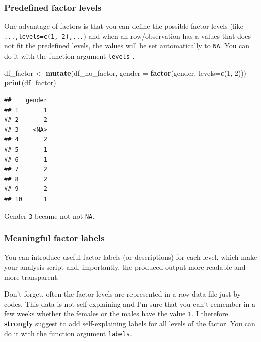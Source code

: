 \documentclass[
]{scrartcl}
\newenvironment{Shaded}{\begin{snugshade}}{\end{snugshade}}
\newcommand{\DataTypeTok}[1]{\textcolor[rgb]{0.13,0.29,0.53}{#1}}
\newcommand{\DecValTok}[1]{\textcolor[rgb]{0.00,0.00,0.81}{#1}}
\newcommand{\KeywordTok}[1]{\textcolor[rgb]{0.13,0.29,0.53}{\textbf{#1}}}
\newcommand{\NormalTok}[1]{#1}
\newcommand{\StringTok}[1]{\textcolor[rgb]{0.31,0.60,0.02}{#1}}
\begin{document}
\hypertarget{predefined-factor-levels}{%
\subsubsection{Predefined factor levels}\label{predefined-factor-levels}}

One advantage of factors is that you can define the possible factor levels (like \texttt{...,levels=c(1,\ 2),...}) and when an row/observation has a values that does not fit the predefined levels, the values will be set automatically to \texttt{NA}. You can do it with the function argument \texttt{levels} .

\begin{Shaded}
\begin{Highlighting}[]
\NormalTok{df\_factor \textless{}{-}}\StringTok{  }\KeywordTok{mutate}\NormalTok{(df\_no\_factor,}
            \DataTypeTok{gender =} \KeywordTok{factor}\NormalTok{(gender, }\DataTypeTok{levels=}\KeywordTok{c}\NormalTok{(}\DecValTok{1}\NormalTok{, }\DecValTok{2}\NormalTok{)))}
\KeywordTok{print}\NormalTok{(df\_factor)}
\end{Highlighting}
\end{Shaded}

\begin{verbatim}
##    gender
## 1       1
## 2       2
## 3    <NA>
## 4       2
## 5       1
## 6       1
## 7       2
## 8       2
## 9       2
## 10      1
\end{verbatim}

Gender \texttt{3} became not not \texttt{NA}.

\hypertarget{meaningful-factor-labels}{%
\subsubsection{Meaningful factor labels}\label{meaningful-factor-labels}}

You can introduce useful factor labels (or descriptions) for each level, which make your analysis script and, importantly, the produced output more readable and more transparent.

Don't forget, often the factor levels are represented in a raw data file just by codes. This data is not self-explaining and I'm sure that you can't remember in a few weeks whether the females or the males have the value \texttt{1}. I therefore \textbf{strongly} suggest to add self-explaining labels for all levels of the factor. You can do it with the function argument \texttt{labels}.
\end{document}
